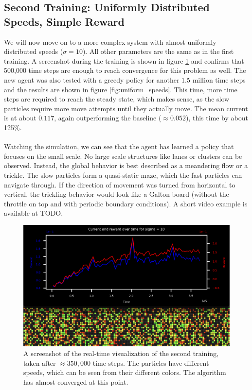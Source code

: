 \subsection{Second Training: Uniformly Distributed Speeds, Simple Reward}
\label{sec:second_training}
We will now move on to a more complex system with almost uniformly distributed speeds ($\sigma=10$). All other parameters are the same as in the first training. A screenshot during the training is shown in figure \ref{fig:second_training_screenshot} and confirms that 500,000 time steps are enough to reach convergence for this problem as well. The new agent was also tested with a greedy policy for another $1.5$ million time steps and the results are shown in figure \ref{fig:uniform_speeds}. This time, more time steps are required to reach the steady state, which makes sense, as the slow particles require more move attempts until they actually move. The mean current is at about $0.117$, again outperforming the baseline ($\approx 0.052$), this time by about 125\%. 
\\
\\
Watching the simulation, we can see that the agent has learned a policy that focuses on the small scale. No large scale structures like lanes or clusters can be observed. Instead, the global behavior is best described as a meandering flow or a trickle. The slow particles form a quasi-static maze, which the fast particles can navigate through. If the direction of movement was turned from horizontal to vertical, the trickling behavior would look like a Galton board (without the throttle on top and with periodic boundary conditions). A short video example is available at TODO.

\begin{figure}[h]
    \centering
    \includegraphics[width=\textwidth]{second_training_screenshot.png}
    \caption{A screenshot of the real-time visualization of the second training, taken after $\approx 350,000$ time steps. The particles have different speeds, which can be seen from their different colors. The algorithm has almost converged at this point.}
    \label{fig:second_training_screenshot}
\end{figure}

